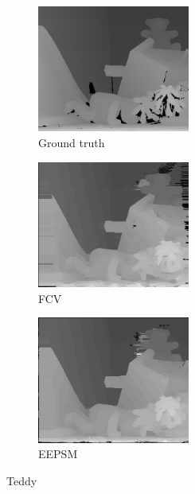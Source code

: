 \begin{figure}[ht]
  \centering
  \begin{subfigure}[t]{0.3\textwidth}
    \centering\includegraphics[width=5cm]{figures/ted_gt}
    \caption{Ground truth \cite{Scharstein2003}\label{fig:ted_gt}}
  \end{subfigure}\hspace{0.5cm}
  \begin{subfigure}[t]{0.3\textwidth}
    \centering\includegraphics[width=5cm]{figures/ted_fcv}
    \caption{FCV\label{fig:ted_fcv}}
  \end{subfigure}\hspace{0.5cm}
  \begin{subfigure}[t]{0.3\textwidth}
    \centering\includegraphics[width=5cm]{figures/ted_eepsm1}
    \caption{EEPSM\label{fig:ted_eepsm}}
  \end{subfigure}
  \caption{Teddy \cite{Scharstein2003} \label{fig:tedall}}
\end{figure}

